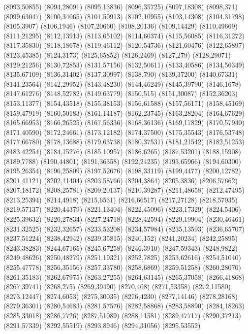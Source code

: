 (8093,50855)
(8094,28091)
(8095,13836)
(8096,35725)
(8097,18308)
(8098,371)
(8099,63047)
(8100,34065)
(8101,50913)
(8102,10955)
(8103,14308)
(8104,31798)
(8105,3907)
(8106,1946)
(8107,20660)
(8108,20136)
(8109,14429)
(8110,49669)
(8111,21295)
(8112,13913)
(8113,65102)
(8114,60374)
(8115,56085)
(8116,31272)
(8117,35830)
(8118,18678)
(8119,46112)
(8120,54736)
(8121,60476)
(8122,65897)
(8123,45385)
(8124,3173)
(8125,65852)
(8126,2469)
(8127,279)
(8128,29071)
(8129,21256)
(8130,72853)
(8131,57156)
(8132,50611)
(8133,40586)
(8134,56349)
(8135,67109)
(8136,31402)
(8137,30997)
(8138,790)
(8139,37200)
(8140,67331)
(8141,23564)
(8142,29952)
(8143,48230)
(8144,46249)
(8145,39790)
(8146,1678)
(8147,61276)
(8148,52782)
(8149,63779)
(8150,515)
(8151,30087)
(8152,36203)
(8153,11377)
(8154,43518)
(8155,38153)
(8156,61588)
(8157,56171)
(8158,45169)
(8159,47919)
(8160,50183)
(8161,14187)
(8162,23745)
(8163,28204)
(8164,67629)
(8165,66953)
(8166,26525)
(8167,56336)
(8168,36136)
(8169,17829)
(8170,57940)
(8171,40590)
(8172,24661)
(8173,12182)
(8174,37500)
(8175,35543)
(8176,53748)
(8177,66780)
(8178,13688)
(8179,63738)
(8180,37531)
(8181,21542)
(8182,51253)
(8183,42254)
(8184,15276)
(8185,10957)
(8186,6265)
(8187,53201)
(8188,15908)
(8189,7788)
(8190,44801)
(8191,36358)
(8192,24235)
(8193,65966)
(8194,60300)
(8195,26354)
(8196,25809)
(8197,52676)
(8198,33119)
(8199,4477)
(8200,12782)
(8201,41121)
(8202,11404)
(8203,58766)
(8204,3864)
(8205,3836)
(8206,57662)
(8207,18172)
(8208,25781)
(8209,20137)
(8210,39287)
(8211,48658)
(8212,47495)
(8213,25394)
(8214,4918)
(8215,6531)
(8216,66517)
(8217,27128)
(8218,57935)
(8219,57137)
(8220,44379)
(8221,13404)
(8222,45096)
(8223,17329)
(8224,5406)
(8225,39632)
(8226,27834)
(8227,24718)
(8228,42594)
(8229,19904)
(8230,46461)
(8231,32525)
(8232,32657)
(8233,53208)
(8234,57984)
(8235,13593)
(8236,65707)
(8237,51224)
(8238,42942)
(8239,35815)
(8240,152)
(8241,20234)
(8242,25895)
(8243,38283)
(8244,67165)
(8245,67258)
(8246,3910)
(8247,59343)
(8248,9822)
(8249,48626)
(8250,48279)
(8251,19321)
(8252,7825)
(8253,62616)
(8254,51040)
(8255,47778)
(8256,35156)
(8257,33780)
(8258,6869)
(8259,51258)
(8260,28070)
(8261,35183)
(8262,67975)
(8263,27255)
(8264,63145)
(8265,37058)
(8266,41868)
(8267,39741)
(8268,275)
(8269,39490)
(8270,408)
(8271,53358)
(8272,11580)
(8273,12447)
(8274,6053)
(8275,30035)
(8276,4230)
(8277,14146)
(8278,28168)
(8279,36301)
(8280,54683)
(8281,57576)
(8282,58868)
(8283,58890)
(8284,18263)
(8285,33018)
(8286,7726)
(8287,51089)
(8288,11581)
(8289,47717)
(8290,37213)
(8291,57339)
(8292,55519)
(8293,8946)
(8294,31056)
(8295,53552)
